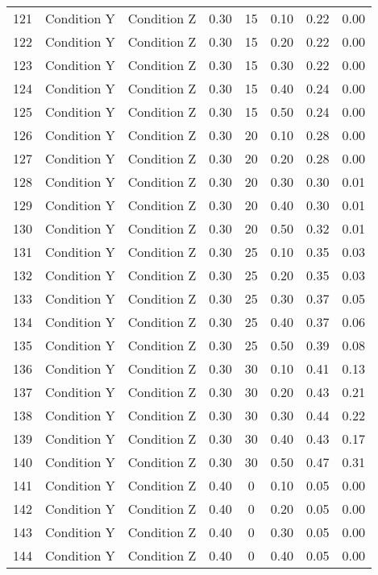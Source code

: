 \begin{landscape}
\begin{longtable}{cc cc cc cc}
  121 & Condition Y & Condition Z & 0.30 &  15 & 0.10 & 0.22 & 0.00 \\ 
  122 & Condition Y & Condition Z & 0.30 &  15 & 0.20 & 0.22 & 0.00 \\ 
  123 & Condition Y & Condition Z & 0.30 &  15 & 0.30 & 0.22 & 0.00 \\ 
  124 & Condition Y & Condition Z & 0.30 &  15 & 0.40 & 0.24 & 0.00 \\ 
  125 & Condition Y & Condition Z & 0.30 &  15 & 0.50 & 0.24 & 0.00 \\ 
  126 & Condition Y & Condition Z & 0.30 &  20 & 0.10 & 0.28 & 0.00 \\ 
  127 & Condition Y & Condition Z & 0.30 &  20 & 0.20 & 0.28 & 0.00 \\ 
  128 & Condition Y & Condition Z & 0.30 &  20 & 0.30 & 0.30 & 0.01 \\ 
  129 & Condition Y & Condition Z & 0.30 &  20 & 0.40 & 0.30 & 0.01 \\ 
  130 & Condition Y & Condition Z & 0.30 &  20 & 0.50 & 0.32 & 0.01 \\ 
  131 & Condition Y & Condition Z & 0.30 &  25 & 0.10 & 0.35 & 0.03 \\ 
  132 & Condition Y & Condition Z & 0.30 &  25 & 0.20 & 0.35 & 0.03 \\ 
  133 & Condition Y & Condition Z & 0.30 &  25 & 0.30 & 0.37 & 0.05 \\ 
  134 & Condition Y & Condition Z & 0.30 &  25 & 0.40 & 0.37 & 0.06 \\ 
  135 & Condition Y & Condition Z & 0.30 &  25 & 0.50 & 0.39 & 0.08 \\ 
  136 & Condition Y & Condition Z & 0.30 &  30 & 0.10 & 0.41 & 0.13 \\ 
  137 & Condition Y & Condition Z & 0.30 &  30 & 0.20 & 0.43 & 0.21 \\ 
  138 & Condition Y & Condition Z & 0.30 &  30 & 0.30 & 0.44 & 0.22 \\ 
  139 & Condition Y & Condition Z & 0.30 &  30 & 0.40 & 0.43 & 0.17 \\ 
  140 & Condition Y & Condition Z & 0.30 &  30 & 0.50 & 0.47 & 0.31 \\ 
  141 & Condition Y & Condition Z & 0.40 &   0 & 0.10 & 0.05 & 0.00 \\ 
  142 & Condition Y & Condition Z & 0.40 &   0 & 0.20 & 0.05 & 0.00 \\ 
  143 & Condition Y & Condition Z & 0.40 &   0 & 0.30 & 0.05 & 0.00 \\ 
  144 & Condition Y & Condition Z & 0.40 &   0 & 0.40 & 0.05 & 0.00 \\ 

\end{longtable}
\end{landscape}
